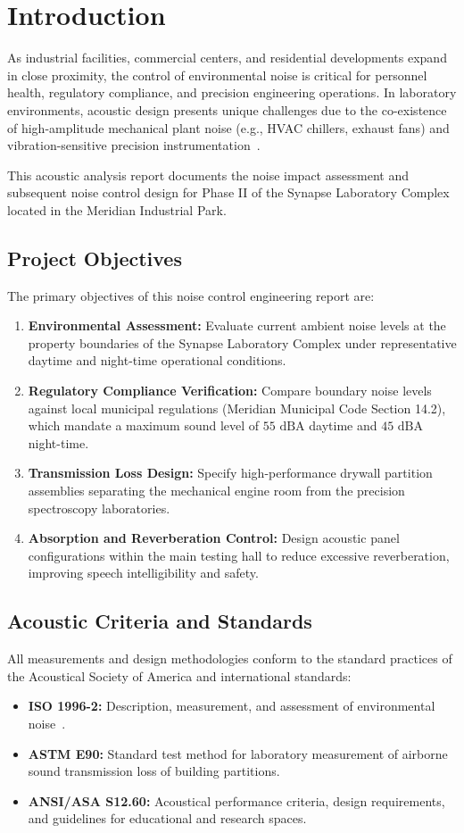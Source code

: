 \section{Introduction}
As industrial facilities, commercial centers, and residential developments expand in close proximity, the control of environmental noise is critical for personnel health, regulatory compliance, and precision engineering operations. In laboratory environments, acoustic design presents unique challenges due to the co-existence of high-amplitude mechanical plant noise (e.g., HVAC chillers, exhaust fans) and vibration-sensitive precision instrumentation~\cite{Harris1991}.

This acoustic analysis report documents the noise impact assessment and subsequent noise control design for Phase II of the Synapse Laboratory Complex located in the Meridian Industrial Park. 

\subsection{Project Objectives}
The primary objectives of this noise control engineering report are:
\begin{enumerate}
    \item \textbf{Environmental Assessment:} Evaluate current ambient noise levels at the property boundaries of the Synapse Laboratory Complex under representative daytime and night-time operational conditions.
    \item \textbf{Regulatory Compliance Verification:} Compare boundary noise levels against local municipal regulations (Meridian Municipal Code Section 14.2), which mandate a maximum sound level of $55\text{~dBA}$ daytime and $45\text{~dBA}$ night-time.
    \item \textbf{Transmission Loss Design:} Specify high-performance drywall partition assemblies separating the mechanical engine room from the precision spectroscopy laboratories.
    \item \textbf{Absorption and Reverberation Control:} Design acoustic panel configurations within the main testing hall to reduce excessive reverberation, improving speech intelligibility and safety.
\end{enumerate}

\subsection{Acoustic Criteria and Standards}
All measurements and design methodologies conform to the standard practices of the Acoustical Society of America and international standards:
\begin{itemize}
    \item \textbf{ISO 1996-2:} Description, measurement, and assessment of environmental noise~\cite{ISO1996}.
    \item \textbf{ASTM E90:} Standard test method for laboratory measurement of airborne sound transmission loss of building partitions.
    \item \textbf{ANSI/ASA S12.60:} Acoustical performance criteria, design requirements, and guidelines for educational and research spaces.
\end{itemize}

